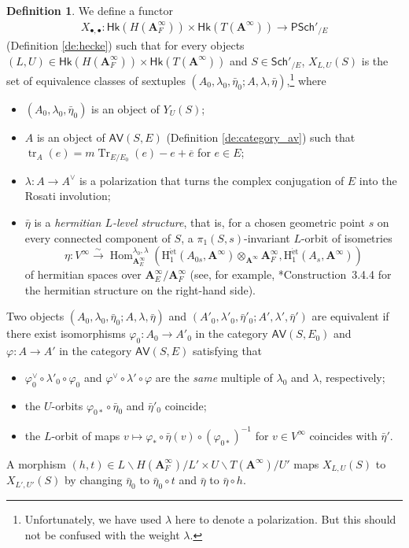 \documentclass[12pt]{amsart}
\numberwithin{equation}{section}
\theoremstyle{plain}
\theoremstyle{definition}
\newtheorem{definition}[proposition]{Definition}
\theoremstyle{remark}
\renewcommand{\b}[1]{\mathbf{#1}}
\renewcommand{\r}[1]{\mathrm{#1}}
\renewcommand{\sf}[1]{\mathsf{#1}}
\renewcommand{\(}{\left(}
\renewcommand{\)}{\right)}
\newcommand{\ol}[1]{\overline{#1}{}}
\newcommand{\bA}{\b A}
\newcommand{\rH}{\r H}
\newcommand{\sfP}{\sf P}
\newcommand{\et}{{\acute{\r{e}}\r{t}}}
\newcommand{\Sch}{\sf{Sch}}
\newcommand{\AV}{\sf{AV}}
\newcommand{\Hk}{\sf{Hk}}
\DeclareMathOperator{\Hom}{Hom}
\DeclareMathOperator{\tr}{tr}
\DeclareMathOperator{\Tr}{Tr}
\begin{document}
\begin{definition}\label{de:moduli_rational}
We define a functor
\begin{align*}
X_{\bullet,\bullet}\colon\Hk(H(\bA_F^\infty))\times\Hk(T(\bA^\infty))\to\sfP\Sch'_{/E}
\end{align*}
(Definition \ref{de:hecke}) such that for every objects $(L,U)\in\Hk(H(\bA_F^\infty))\times\Hk(T(\bA^\infty))$ and $S\in\Sch'_{/E}$, $X_{L,U}(S)$ is the set of equivalence classes of sextuples $(A_0,\lambda_0,\bar\eta_0;A,\lambda,\bar\eta)$,\footnote{Unfortunately, we have used $\lambda$ here to denote a polarization. But this should not be confused with the weight $\lambda$.} where
\begin{itemize}
  \item $(A_0,\lambda_0,\bar\eta_0)$ is an object of $Y_U(S)$;

  \item $A$ is an object of $\AV(S,E)$ (Definition \ref{de:category_av}) such that $\tr_A(e)=m\Tr_{E/E_0}(e)-e+\ol{e}$ for $e\in E$;

  \item $\lambda\colon A\to A^\vee$ is a polarization that turns the complex conjugation of $E$ into the Rosati involution;

  \item $\bar\eta$ is a \emph{hermitian $L$-level structure}, that is, for a chosen geometric point $s$ on every connected component of $S$, a $\pi_1(S,s)$-invariant $L$-orbit of isometries
      \[
      \eta\colon V^\infty\xrightarrow\sim\Hom_{\bA_E^\infty}^{\lambda_0,\lambda}
      \(\rH_1^{\et}(A_{0s},\bA^\infty)\otimes_{\bA^\infty}\bA_F^\infty,\rH_1^{\et}(A_s,\bA^\infty)\)
      \]
      of hermitian spaces over $\bA_E^\infty/\bA_F^\infty$ (see, for example, \cite{LTXZZ}*{Construction~3.4.4} for the hermitian structure on the right-hand side).
\end{itemize}
Two objects $(A_0,\lambda_0,\bar\eta_0;A,\lambda,\bar\eta)$ and $(A'_0,\lambda'_0,\bar\eta'_0;A',\lambda',\bar\eta')$ are equivalent if there exist isomorphisms $\varphi_0\colon A_0\to A'_0$ in the category $\AV(S,E_0)$ and $\varphi\colon A\to A'$ in the category $\AV(S,E)$ satisfying that
\begin{itemize}
  \item $\varphi_0^\vee\circ\lambda'_0\circ\varphi_0$ and $\varphi^\vee\circ\lambda'\circ\varphi$ are the \emph{same} multiple of $\lambda_0$ and $\lambda$, respectively;

  \item the $U$-orbits $\varphi_{0*}\circ\bar\eta_0$ and $\bar\eta'_0$ coincide;

  \item the $L$-orbit of maps $v\mapsto\varphi_*\circ\bar\eta(v)\circ(\varphi_{0*})^{-1}$ for $v\in V^\infty$ coincides with $\bar\eta'$.
\end{itemize}
A morphism $(h,t)\in L\backslash H(\bA_F^\infty)/L'\times U\backslash T(\bA^\infty)/U'$ maps $X_{L,U}(S)$ to $X_{L',U'}(S)$ by changing $\bar\eta_0$ to $\bar\eta_0\circ t$ and $\bar\eta$ to $\bar\eta\circ h$.
\end{definition}
\end{document}
